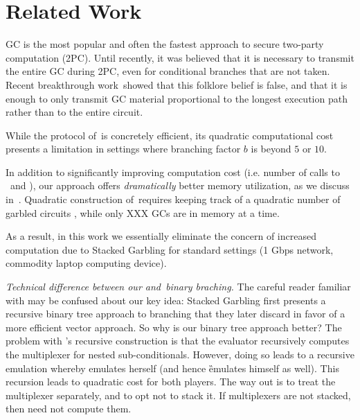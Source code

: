 \section{Related Work}\label{sec:relwork}



GC is the most popular and often the fastest approach to secure two-party computation
(2PC).  Until recently, it was believed that it is necessary
to transmit the entire GC during 2PC, even for conditional branches that
are not taken.  Recent breakthrough work~\HK showed that this folklore belief is false, and that  it is enough to only transmit GC material  proportional to the
longest execution path rather than to the entire circuit.

While the protocol of~\HK is concretely efficient, its quadratic computational cost presents a  limitation in settings where branching factor $b$ is beyond $5$ or $10$.  

In addition to significantly improving computation cost (i.e. number of calls to \Gb\ and \Ev), our approach offers {\em dramatically} better memory utilization, as we discuss in~.  Quadratic construction of~\HK requires keeping track of a quadratic number of garbled circuits , while only XXX GCs are in memory at a time.

As a result, in this work we essentially eliminate the concern of increased computation due to Stacked Garbling for standard settings (1 Gbps network, commodity laptop computing device). 


{\em Technical difference between our and~\HK binary braching.}
The careful reader familiar with \cite{EPRINT:HeaKol20b} may be
confused about our key idea: Stacked Garbling first presents a
recursive binary tree approach to branching that they later
discard in favor of a more efficient vector approach.
So why is our binary tree approach better?
The problem with \cite{EPRINT:HeaKol20b}'s recursive construction
is that the evaluator recursively computes the multiplexer for
nested sub-conditionals.
However, doing so leads to a recursive emulation whereby \E
emulates herself (and hence \G emulates himself as well).
This recursion leads to quadratic cost for both players.
The way out is to treat the multiplexer separately, and to opt not
to stack it.
If multiplexers are not stacked, then \E need not compute them.




